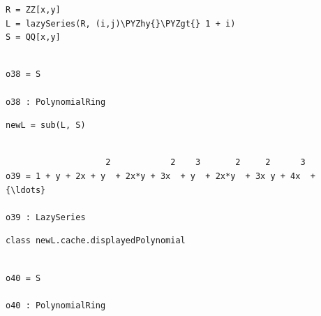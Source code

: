 \documentclass[11pt]{article}
\makeatletter
\def\PYZgt{\char`\>}
\def\PYZhy{\char`\-}
\newcommand{\boxspacing}{\kern\kvtcb@left@rule\kern\kvtcb@boxsep}
\newcommand{\prompt}[4]{
        {\ttfamily\llap{{\color{#2}[#3]:\hspace{3pt}#4}}\vspace{-\baselineskip}}
    }
\makeatother
\begin{document}
    \begin{tcolorbox}[breakable, size=fbox, boxrule=1pt, pad at break*=1mm,colback=cellbackground, colframe=cellborder]
\prompt{In}{incolor}{38}{\boxspacing}
\begin{Verbatim}[commandchars=\\\{\}]
R = ZZ[x,y]
L = lazySeries(R, (i,j)\PYZhy{}\PYZgt{} 1 + i)
S = QQ[x,y]
\end{Verbatim}
\end{tcolorbox}

    \begin{Verbatim}[commandchars=\\\{\}]

o38 = S

o38 : PolynomialRing
    \end{Verbatim}

    \begin{tcolorbox}[breakable, size=fbox, boxrule=1pt, pad at break*=1mm,colback=cellbackground, colframe=cellborder]
\prompt{In}{incolor}{39}{\boxspacing}
\begin{Verbatim}[commandchars=\\\{\}]
newL = sub(L, S)
\end{Verbatim}
\end{tcolorbox}

    \begin{Verbatim}[commandchars=\\\{\}]

                    2            2    3       2     2      3
o39 = 1 + y + 2x + y  + 2x*y + 3x  + y  + 2x*y  + 3x y + 4x  + {\ldots}

o39 : LazySeries
    \end{Verbatim}

    \begin{tcolorbox}[breakable, size=fbox, boxrule=1pt, pad at break*=1mm,colback=cellbackground, colframe=cellborder]
\prompt{In}{incolor}{40}{\boxspacing}
\begin{Verbatim}[commandchars=\\\{\}]
class newL.cache.displayedPolynomial
\end{Verbatim}
\end{tcolorbox}

    \begin{Verbatim}[commandchars=\\\{\}]

o40 = S

o40 : PolynomialRing
    \end{Verbatim}
\end{document}
